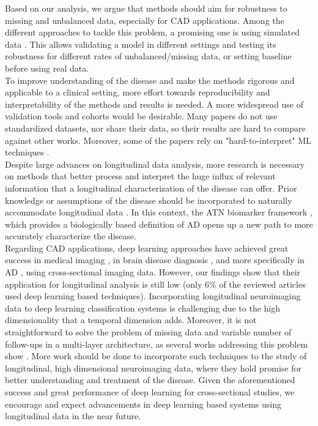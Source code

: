 Based on our analysis, we argue that methods should aim for robustness to missing and unbalanced data, especially for CAD applications. Among the different approaches to tackle this problem, a promising one is using simulated data \cite{Chen2011b,Chen2012,Eshaghi2017,Hyun2016,Li2017b,Li2013,Zhang2014,Ziegler2015b}. This allows validating a model in different settings and testing its robustness for different rates of unbalanced/missing data, or setting baseline before using real data. \\

To improve understanding of the disease and make the methods rigorous and applicable to a clinical setting, more effort towards reproducibility and interpretability of the methods and results is needed. A more widespread use of validation tools and cohorts would be desirable. Many papers do not use standardized datasets, nor share their data, so their results are hard to compare against other works. Moreover, some of the papers rely on "hard-to-interpret" ML techniques \cite{Givon2017,Zhang2017}. \\

Despite large advances on longitudinal data analysis, more research is necessary on methods that better process and interpret the huge influx of relevant information that a longitudinal characterization of the disease can offer. Prior knowledge or assumptions of the disease should be incorporated to naturally accommodate longitudinal data \cite{Fonteijn2012,Gavidia-Bovadilla2017,Zhu2016a}. In this context, the ATN biomarker framework \cite{Jack2018}, which provides a biologically based definition of AD opens up a new path to more accurately characterize the disease. \\

Regarding CAD applications, deep learning approaches have achieved great success in medical imaging \cite{Litjens2017}, in brain disease diagnosis \cite{Talo2019,Talo2019b}, and more specifically in AD \cite{Liu2014,Jo2019}, using cross-sectional imaging data. However, our findings show that their application for longitudinal analysis is still low (only $6\%$ of the reviewed articles used deep learning based techniques). Incorporating longitudinal neuroimaging data to deep learning classification systems is challenging due to the high dimensionality that a temporal dimension adds. Moreover, it is not straightforward to solve the problem of missing data and variable number of follow-ups in a multi-layer architecture, as several works addressing this problem show \cite{Givon2017,Ghazi2019}. More work should be done to incorporate such techniques to the study of longitudinal, high dimensional neuroimaging data, where they hold promise for better understanding and treatment of the disease. Given the aforementioned success and great performance of deep learning for cross-sectional studies, we encourage and expect advancements in deep learning based systems using longitudinal data in the near future.\\

